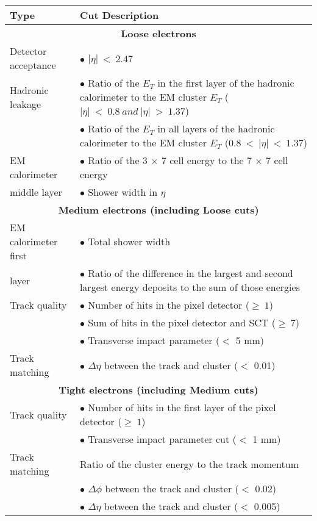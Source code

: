 \begin{table}
\begin{center}
\begin{tabular}{|p{4cm}|p{11cm}|}
\hline
Type & Cut Description \\
\hline
\multicolumn{2}{|c|}{\textbf{Loose electrons}}\\
\hline
Detector acceptance & $\bullet$ $|\eta|\ <\ 2.47$ \\
\hline
Hadronic leakage & $\bullet$ Ratio of the $E_{T}$ in the first layer of the hadronic calorimeter to the EM cluster $E_T$ ($|\eta|\ <\ 0.8\ and\ |\eta|\ >\ 1.37$) \\
                 & $\bullet$ Ratio of the $E_T$ in all layers of the hadronic calorimeter to the EM cluster $E_T$ ($0.8\ <\ |\eta|\ <\ 1.37$) \\
\hline
EM calorimeter & $\bullet$ Ratio of the 3 $\times$ 7 cell energy to the 7 $\times$ 7 cell energy \\
middle layer   & $\bullet$ Shower width in $\eta$ \\
\hline
\multicolumn{2}{|c|}{\textbf{Medium electrons (including Loose cuts)}} \\
\hline
EM calorimeter first & $\bullet$ Total shower width \\
layer                & $\bullet$ Ratio of the difference in the largest and second largest energy deposits to the sum of those energies \\
\hline
Track quality & $\bullet$ Number of hits in the pixel detector ($\ge\ 1$) \\
              & $\bullet$ Sum of hits in the pixel detector and SCT ($\ge\ 7$) \\
              & $\bullet$ Transverse impact parameter ($<$ 5 mm) \\
\hline
Track matching & $\bullet$ $\Delta\eta$ between the track and cluster ($<$ 0.01) \\
\hline
\multicolumn{2}{|c|}{\textbf{Tight electrons (including Medium cuts)}} \\
\hline
Track quality & $\bullet$ Number of hits in the first layer of the pixel detector ($\ge\ 1$) \\
              & $\bullet$ Transverse impact parameter cut ($<$ 1 mm) \\
\hline
Track matching & Ratio of the cluster energy to the track momentum \\
               & $\bullet$ $\Delta\phi$ between the track and cluster ($<$ 0.02) \\
               & $\bullet$ $\Delta\eta$ between the track and cluster ($<$ 0.005) \\

\end{tabular}
\end{center}
\end{table}
